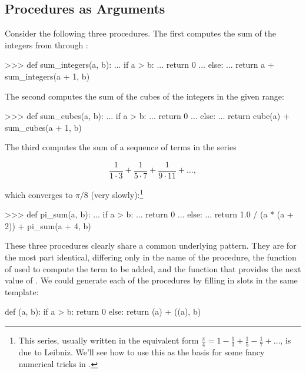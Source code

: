 \subsection{Procedures as Arguments}
\label{Section 1.3.1}

Consider the following three procedures.  The first computes the sum of the
integers from  through :

\begin{codeBlock}
>>> def sum_integers(a, b):
...     if a > b:
...         return 0
...     else:
...         return a + sum_integers(a + 1, b)
\end{codeBlock}

\noindent
The second computes the sum of the cubes of the integers in the given range:

\begin{codeBlock}
>>> def sum_cubes(a, b):
...     if a > b:
...         return 0
...     else:
...         return cube(a) + sum_cubes(a + 1, b)
\end{codeBlock}

\noindent
The third computes the sum of a sequence of terms in the series

$$ \frac{1}{1\cdot 3} +  \frac{1}{5\cdot 7} + \frac{1}{9\cdot 11} + \dots, $$

\noindent
which converges to \( \pi / 8 \) (very slowly):\footnote{This series, usually
written in the equivalent form
\( \frac{\pi}{4} = 1 - \frac{1}{3} + \frac{1}{5} - \frac{1}{7} + \dots \),
is due to Leibniz.  We'll see how to use this as the basis for some
fancy numerical tricks in .}

\begin{codeBlock}
>>> def pi_sum(a, b):
...     if a > b:
...         return 0
...     else:
...         return 1.0 / (a * (a + 2)) + pi_sum(a + 4, b)
\end{codeBlock}

\noindent
These three procedures clearly share a common underlying pattern.  They are for
the most part identical, differing only in the name of the procedure, the
function of  used to compute the term to be added, and the function
that provides the next value of .  We could generate each of the
procedures by filling in slots in the same template:

\begin{syntaxForm}
def (a, b):
    if a > b:
        return 0
    else:
        return (a) + ((a), b)
\end{syntaxForm}


